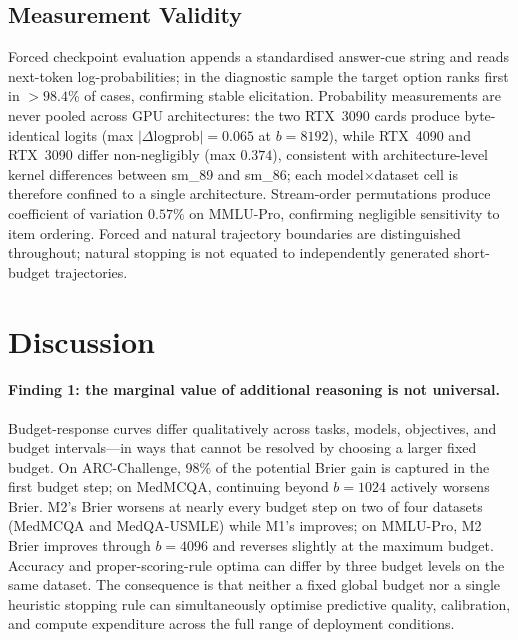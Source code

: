 \documentclass[a4paper,fleqn]{cas-sc}
\theoremstyle{plain}
\theoremstyle{definition}
\theoremstyle{remark}
\begin{document}
\subsection{Measurement Validity}
\label{sec:validity}

Forced checkpoint evaluation appends a standardised answer-cue string and
reads next-token log-probabilities; in the diagnostic sample the target option
ranks first in $>98.4\%$ of cases, confirming stable elicitation.
Probability measurements are never pooled across GPU architectures: the two
RTX~3090 cards produce byte-identical logits (max $|\Delta\text{logprob}|=0.065$
at $b=8192$), while RTX~4090 and RTX~3090 differ non-negligibly (max $0.374$),
consistent with architecture-level kernel differences between sm\_89 and sm\_86;
each model$\times$dataset cell is therefore confined to a single architecture.
Stream-order permutations produce coefficient of variation $0.57\%$ on
MMLU-Pro, confirming negligible sensitivity to item ordering.
Forced and natural trajectory boundaries are distinguished throughout; natural
stopping is not equated to independently generated short-budget trajectories.

\FloatBarrier
\section{Discussion}

\paragraph{Finding 1: the marginal value of additional reasoning is not
universal.}
Budget-response curves differ qualitatively across tasks, models, objectives,
and budget intervals---in ways that cannot be resolved by choosing a larger
fixed budget.
On ARC-Challenge, 98\% of the potential Brier gain is captured in the first
budget step; on MedMCQA, continuing beyond $b=1024$ actively worsens Brier.
M2's Brier worsens at nearly every budget step on two of four datasets (MedMCQA and
MedQA-USMLE) while M1's improves; on MMLU-Pro, M2 Brier improves through
$b=4096$ and reverses slightly at the maximum budget.
Accuracy and proper-scoring-rule optima can differ by three budget levels on
the same dataset.
The consequence is that neither a fixed global budget nor a single heuristic
stopping rule can simultaneously optimise predictive quality, calibration, and
compute expenditure across the full range of deployment conditions.
\end{document}
